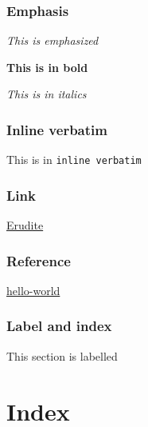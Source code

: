 \documentclass[11pt,pdflatex,makeidx]{scrbook}   %
\begin{document}
\subsection{Emphasis}
\emph{This is emphasized}

\textbf{This is in bold}

\textit{This is in italics}
\subsection{Inline verbatim}
This is in \verb|inline verbatim|
\subsection{Link}
\href{https://github.com/mmontone/erudite}{Erudite}
\subsection{Reference}
\hyperref[hello-world]{hello-world}
\subsection{Label and index}
\label{label-test}
This section is labelled
\chapter{Index}
\printindex
\end{document}
